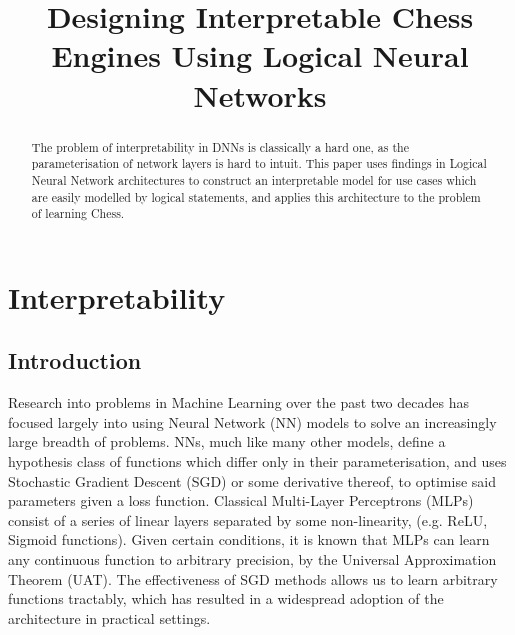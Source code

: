 \documentclass[conference]{report}
\begin{document}
\def\T{\textbf{T}}
\def\F{\textbf{F}}
\def\NOT{\texttt{NOT}}
\def\AND{\texttt{AND}}
\def\OR{\texttt{OR}}
\def\XOR{\texttt{XOR}}
\def\R{\mathbb{R}}
\def\B{\mathbb{B}}
\def\N{\mathbb{N}}

\def\custop#1{{\mspace{4mu}#1\mspace{4mu}}}
\def\concat{\custop{@}}

\title{\LARGE Designing Interpretable Chess Engines Using Logical Neural Networks}

\maketitle
\thispagestyle{plain}
\pagestyle{plain}

\begin{abstract}
The problem of interpretability in DNNs is classically a hard one, as the parameterisation of network layers is hard to intuit. This paper uses findings in Logical Neural Network architectures to construct an interpretable model for use cases which are easily modelled by logical statements, and applies this architecture to the problem of learning Chess.  
\end{abstract}

\tableofcontents

\pagebreak

\chapter{Interpretability}

\section{Introduction}

Research into problems in Machine Learning over the past two decades has focused largely into using Neural Network (NN) models to solve an increasingly large breadth of problems. NNs, much like many other models, define a hypothesis class of functions which differ only in their parameterisation, and uses Stochastic Gradient Descent (SGD) or some derivative thereof, to optimise said parameters given a loss function. Classical Multi-Layer Perceptrons (MLPs) consist of a series of linear layers separated by some non-linearity, (e.g. ReLU, Sigmoid functions). Given certain conditions, it is known that MLPs can learn any continuous function to arbitrary precision, by the Universal Approximation Theorem (UAT). The effectiveness of SGD methods allows us to learn arbitrary functions tractably, which has resulted in a widespread adoption of the architecture in practical settings.
\end{document}
